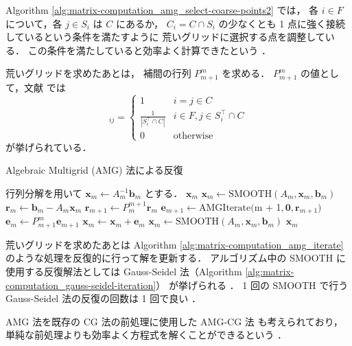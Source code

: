 Algorithm \ref{alg:matrix-computation_amg_select-coarse-points2}
では，
各 $i \in F$ について，各 $j \in S_i$ は $C$ にあるか，
$C_i = C \cap S_i$ の少なくとも 1 点に強く接続しているという条件を満たすように
荒いグリッドに選択する点を調整している．
この条件を満たしていると効率よく計算できたという
\cite{Ruge1987}．

荒いグリッドを求めたあとは，
補間の行列 $P_{m+1}^m$ を求める．
$P_{m+1}^m$ の値として，文献 \cite{Wolters2002} では
\begin{equation}
    [P_{m+1}^m]_{ij} =
    \begin{cases}
        1                                      & i = j \in C                    \\
        \frac{1}{\left|S_i^\top \cap C\right|} & i \in F, j \in S_i^\top \cap C \\
        0                                      & \mathrm{otherwise}
    \end{cases}
\end{equation}
が挙げられている．

\begin{algorithm}[tp]
    \caption{Algebraic Multigrid (AMG) 法による反復 \cite{Wolters2002}}
    \label{alg:matrix-computation_amg_iterate}
    \begin{algorithmic}
        \State 行列分解を用いて $\bm{x}_m \gets A_m^{-1} \bm{b}_m$ とする．
        \State \Return $\bm{x}_m$
        \EndIf
        \State $\bm{x}_m \gets \mathrm{SMOOTH}(A_m, \bm{x}_m, \bm{b}_m)$
        \State $\bm{r}_m \gets \bm{b}_m - A_m \bm{x}_m$
        \State $\bm{r}_{m+1} \gets P_{m}^{m+1} \bm{r}_m$
        \State $\bm{e}_{m+1} \gets \mathrm{AMGIterate}($m + 1$, \bm{0}, \bm{r}_{m+1})$
        \State $\bm{e}_m \gets P_{m+1}^{m} \bm{e}_{m+1}$
        \State $\bm{x}_m \gets \bm{x}_m + \bm{e}_m$
        \State $\bm{x}_m \gets \mathrm{SMOOTH}(A_m, \bm{x}_m, \bm{b}_m)$
        \State \Return $\bm{x}_m$
        \EndProcedure
    \end{algorithmic}
\end{algorithm}

荒いグリッドを求めたあとは
Algorithm \ref{alg:matrix-computation_amg_iterate}
のような処理を反復的に行って解を更新する．
アルゴリズム中の SMOOTH に使用する反復解法としては
Gauss-Seidel 法（Algorithm \ref{alg:matrix-computation_gauss-seidel-iteration}）
が挙げられる
\cite{Ruge1987,Wolters2002}．
1 回の SMOOTH で行う Gauss-Seidel 法の反復の回数は 1 回で良い
\cite{Wolters2002}．

AMG 法を既存の CG 法の前処理に使用した AMG-CG 法
も考えられており，
単純な前処理よりも効率よく方程式を解くことができるという
\cite{Wolters2002}．
